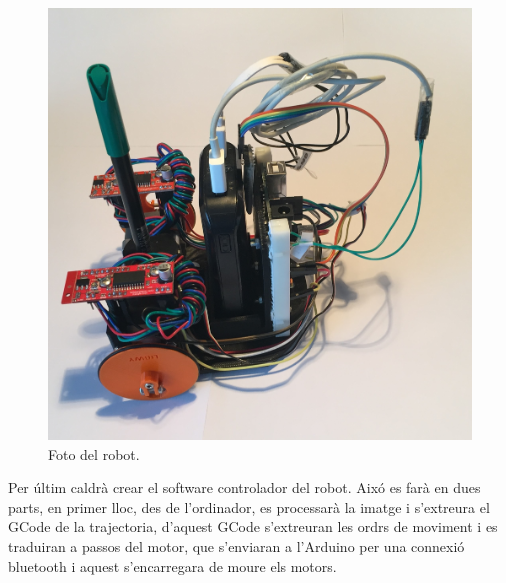 \begin{figure}[H]
	\centering
	\includegraphics[scale=0.1]{RobotFoto}
	\caption{Foto del robot.}
	\label{fig:foto}
\end{figure}

Per últim caldrà crear el software controlador del robot. Aixó es farà en dues parts, en primer lloc, des de l'ordinador, es processarà la imatge i s'extreura el GCode de la trajectoria, d'aquest GCode s'extreuran les ordrs de moviment i es traduiran a passos del motor, que s'enviaran a l'Arduino per una connexió bluetooth i aquest s'encarregara de moure els motors. 

